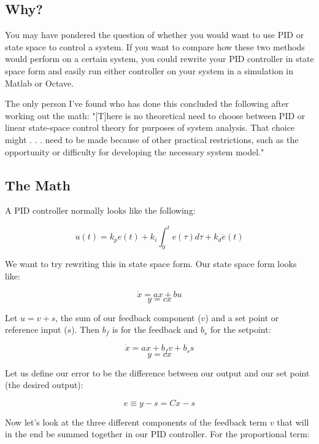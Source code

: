 \documentclass[10pt,letterpaper]{article}
\title{\doctitle}
\author{Garrett Wilson}
\begin{document}
\maketitle
\subsection*{Why?}
You may have pondered the question of whether you would want to use PID or state space to control a system. If you want to compare how these two methods would perform on a certain system, you could rewrite your PID controller in state space form and easily run either controller on your system in a simulation in Matlab or Octave.

The only person I've found who has done this concluded the following after working out the math: "[T]here is no theoretical need to choose between PID or linear state-space control theory for purposes of system analysis. That choice might . . . need to be made because of other practical restrictions, such as the opportunity or difficulty for developing the necessary system model."

\subsection*{The Math}
A PID controller normally looks like the following:

\[u(t) = k_p e(t) + k_i \int_{0}^{t} e(\tau) d\tau + k_d \dot{e}(t) \]

We want to try rewriting this in state space form. Our state space form looks like:

\[ \dot{x} = ax+bu \]
\[ y = cx \]

Let $u = v + s$, the sum of our feedback component ($v$) and a set point or reference input ($s$). Then $b_f$ is for the feedback and $b_s$ for the setpoint:

\begin{equation} \label{eq:state}
\dot{x} = ax + b_f v + b_s s
\end{equation}
\begin{equation} \label{eq:output}
y = cx
\end{equation}

Let us define our error to be the difference between our output and our set point (the desired output):

\[ e \equiv y - s = Cx - s \]

Now let's look at the three different components of the feedback term $v$ that will in the end be summed together in our PID controller. For the proportional term:
\end{document}
